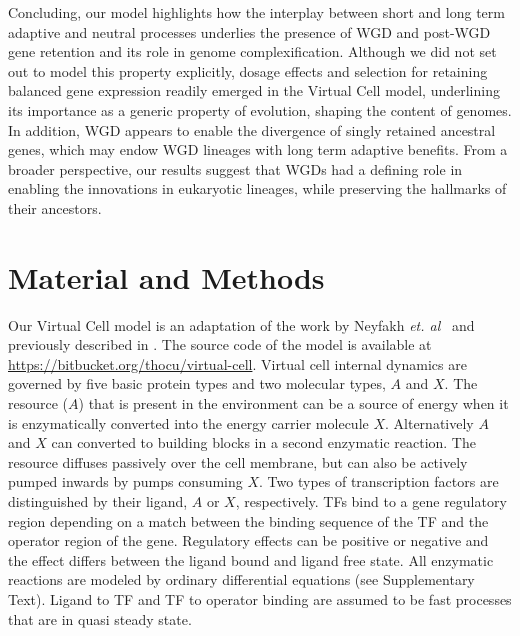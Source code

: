 Concluding, our model highlights how the interplay between short and long term adaptive and neutral processes underlies the presence of WGD and post-WGD gene retention and its role in genome complexification. Although we did not set out to model this property explicitly, dosage effects and selection for retaining balanced gene expression readily emerged in the Virtual Cell model, underlining its importance as a generic property of evolution, shaping the content of genomes. In addition, WGD appears to enable the divergence of singly retained ancestral genes, which may endow WGD lineages with long term adaptive benefits. From a broader perspective, our results suggest that WGDs had a defining role in enabling the innovations in eukaryotic lineages, while preserving the hallmarks of their ancestors. 

\section{Material and Methods}
Our Virtual Cell model is an adaptation of the work by Neyfakh {\it et. al}~\cite{neyfakh_system_2006}
and previously described in \cite{cuypers_virtual_2012}. The source code of the model is available at \url{https://bitbucket.org/thocu/virtual-cell}. Virtual cell internal dynamics are governed by five basic protein types and two molecular types, $A$ and $X$. The resource ($A$) that is present in the environment can be a source of energy when it is enzymatically converted into the energy carrier molecule $X$. Alternatively $A$ and $X$ can converted to building blocks in a second enzymatic reaction. The resource diffuses passively over the cell membrane, but can also be actively pumped inwards by pumps consuming $X$. Two types of transcription factors are distinguished by their ligand, $A$ or $X$, respectively. TFs bind to a gene regulatory region depending on a match between the binding sequence of the TF and the operator region of the gene. Regulatory effects can be positive or negative and the effect differs between the ligand bound and ligand free state. All enzymatic reactions are modeled by ordinary differential equations (see Supplementary Text). Ligand to TF and TF to operator binding are assumed to be fast processes that are in quasi steady state.


